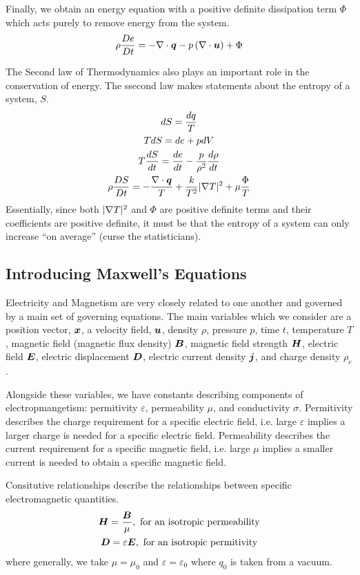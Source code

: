 \documentclass{article}
\begin{document}
Finally, we obtain an energy equation with a positive definite dissipation term
$\Phi$ which acts purely to remove energy from the system. 
\begin{gather*}
    \rho\frac{D e}{D t} = -\nabla \cdot \boldsymbol{q} - p\left(\nabla\cdot\boldsymbol{u}\right) + \Phi
\end{gather*}

The Second law of Thermodynamics also plays an important role in the
conservation of energy. The ssecond law makes statements about the entropy of a
system, $S$.
\begin{gather*}
    dS = \frac{dq}{T}\\
    TdS =  de + pdV\\
    T\frac{d S}{d t} = \frac{d e}{d t} - \frac{p}{\rho^2}\frac{d \rho}{d t}\\
    \rho \frac{D S}{D t} = - \frac{\nabla \cdot \boldsymbol{q}}{T} + \frac{k}{T^2}|
    \nabla T|^2 + \mu\frac{\Phi}{T}
\end{gather*}
Essentially, since both $|\nabla T|^2$ and $\Phi$ are positive definite terms and
their coefficients are positive definite, it must be that the entropy of a
system can only increase ``on average'' (curse the statisticians). 

\subsection{Introducing Maxwell's Equations}

Electricity and Magnetism are very closely related to one another and governed
by a main set of governing equations. The main variables which we consider are a
position vector, $\boldsymbol{x}$, a velocity field, $\boldsymbol{u}$, density $\rho$, pressure
$p$, time $t$, temperature $T$, magnetic field (magnetic flux density) $\boldsymbol{B}$,
magnetic field strength $\boldsymbol{H}$, electric field $\boldsymbol{E}$, electric displacement
$\boldsymbol{D}$, electric current density $\boldsymbol{j}$, and charge density $\rho_e$. 

Alongside these variables, we have constants describing components of
electropmangetism: permitivity $\varepsilon$, permeability $\mu$, and
conductivity $\sigma$. Permitivity describes the charge requirement for a
specific electric field, i.e. large $\varepsilon$ implies a larger charge is
needed for a specific electric field. Permeability describes the current
requirement for a specific magnetic field, i.e. large $\mu$ implies a smaller
current is needed to obtain a specific magnetic field. 

Consitutive relationships describe the relationships between specific
electromagnetic quantities. 
\begin{gather*}
    \boldsymbol{H} = \frac{\boldsymbol{B}}{\mu}, \text{ for an isotropic permeability}\\
    \boldsymbol{D} = \varepsilon \boldsymbol{E}, \text{ for an isotropic permitivity}
\end{gather*}
where generally, we take $\mu = \mu_0$ and $\varepsilon = \varepsilon_0$ where
$q_0$ is taken from a vacuum. 
\end{document}

